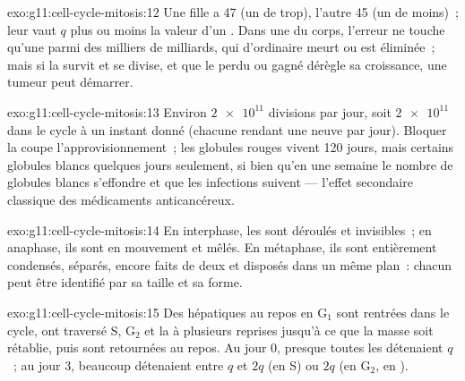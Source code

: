 \begin{solution}{exo:g11:cell-cycle-mitosis:12}
Une fille a 47  (un de trop), l'autre 45 (un de moins)~;
leur  vaut $q$ plus ou moins la valeur d'un . Dans une
 du corps, l'erreur ne touche qu'une  parmi des milliers
de milliards, qui d'ordinaire meurt ou est éliminée~; mais si la
 survit et se divise, et que le  perdu ou gagné
dérègle sa croissance, une tumeur peut démarrer.
\end{solution}

\begin{solution}{exo:g11:cell-cycle-mitosis:13}
Environ $\num{2e11}$ divisions par jour, soit $\num{2e11}$ 
dans le cycle à un instant donné (chacune rendant une  neuve par
jour). Bloquer la  coupe l'approvisionnement~; les globules
rouges vivent 120 jours, mais certains globules blancs quelques jours
seulement, si bien qu'en une semaine le nombre de globules blancs
s'effondre et que les infections suivent --- l'effet secondaire
classique des médicaments anticancéreux.
\end{solution}

\begin{solution}{exo:g11:cell-cycle-mitosis:14}
En interphase, les  sont déroulés et invisibles~; en
anaphase, ils sont en mouvement et mêlés. En métaphase, ils sont
entièrement condensés, séparés, encore faits de deux  et
disposés dans un même plan~: chacun peut être identifié par sa taille
et sa forme.
\end{solution}

\begin{solution}{exo:g11:cell-cycle-mitosis:15}
Des  hépatiques au repos en $\mathrm{G_1}$ sont rentrées dans
le cycle, ont traversé S, $\mathrm{G_2}$ et la  à plusieurs
reprises jusqu'à ce que la masse soit rétablie, puis sont retournées au
repos. Au jour 0, presque toutes les  détenaient $q$~; au jour
3, beaucoup détenaient entre $q$ et $2q$ (en S) ou $2q$ (en
$\mathrm{G_2}$, en ).
\end{solution}

